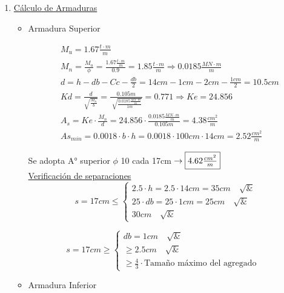 \begin{enumerate}
\begin{itemize}
\end{itemize}
\newpage
\item \underline{Cálculo de Armaduras}\\
\begin{itemize}
\item Armadura Superior

\begin{align*}
& M_u = 1.67 \frac{t \cdot m}{m} \\
& M_n = \frac{M_u}{\phi} = \frac{1.67 \frac{t \cdot m}{m}}{0.9} = 1.85 \frac{t \cdot m}{m} \Rightarrow 0.0185 \frac{MN \cdot m}{m} \\
& d = h -db - Cc - \frac{db}{2} = 14cm - 1cm - 2cm - \frac{1cm}{2}= 10.5cm \\
& Kd = \frac{d}{\sqrt{\frac{M_n}{b}}} = \frac{0.105m}{\sqrt[]{\frac{0.0185 \frac{MN \cdot m}{m}}{1m}}} = 0.771 \Rightarrow Ke = 24.856 \\
& A_s = Ke \cdot \frac{M_n}{d} = 24.856 \cdot \frac{0.0185 \frac{MN \cdot m}{m}}{0.105m} = 4.38 \frac{cm^2}{m}\\
& As_{min} = 0.0018 \cdot b \cdot h = 0.0018 \cdot 100cm \cdot 14cm = 2.52 \frac{cm^2}{m}
\end{align*}

Se adopta A° superior $\phi$ 10 cada 17cm $\rightarrow \framebox{$4.62 \frac{cm^2}{m}$}$ \\

\underline{Verificación de separaciones}\\

\[ s = 17cm \leq \left\{ \begin{array}{ll}
         2.5 \cdot h = 2.5 \cdot 14cm = 35cm \quad \surd & \\
         25 \cdot db = 25 \cdot 1cm = 25cm \quad \surd &\\
         30cm \quad \surd & \end{array} \right. \] 
         
\[ s = 17cm \geq \left\{ \begin{array}{ll}
         db = 1cm \quad \surd & \\
         \geq 2.5cm \quad \surd &\\
         \geq \frac{4}{3} \cdot \text{Tamaño máximo del agregado} & \end{array} \right. \] 

\item Armadura Inferior


\end{itemize}
\end{enumerate}

